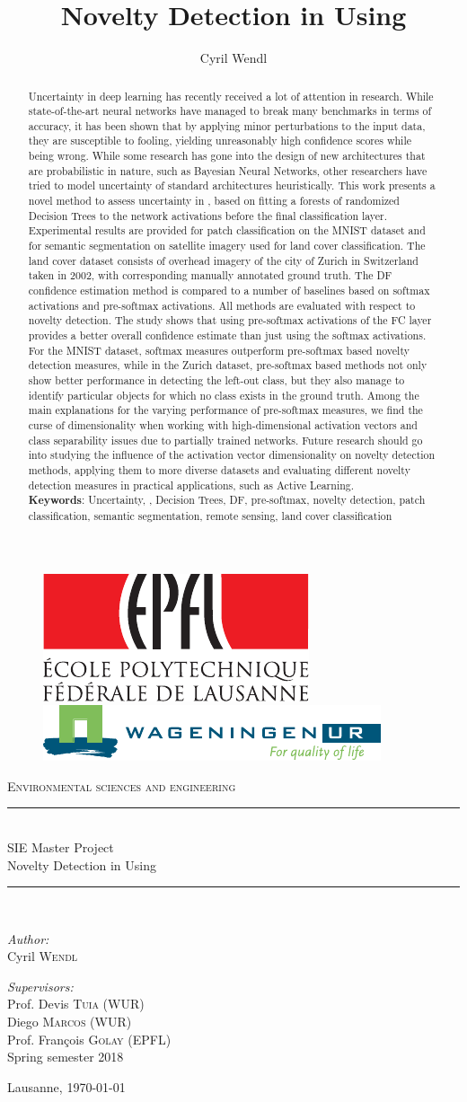 \documentclass[10pt]{article}
\author{Cyril Wendl}
\title{Novelty Detection in \acrlongpl{CNN} Using \acrlongpl{DF}
}
\newcommand{\maketitlepage}{
    \begin{titlepage}
    	\begin{center}
    		\begin{figure}[H]
    			\centering
    			\includegraphics[height=.09\textwidth]{logo} 
    			\hspace{1cm}
    			\includegraphics[height=.07\textwidth]{logo_wur_quality_of_life}
    		\end{figure}
    		\textsc{Environmental sciences and engineering}\\[0.5cm]
    		
    		\newcommand{\HRule}{\rule{\linewidth}{0.2mm}}
    		\HRule \\[0.5cm]
    		{\large SIE Master Project}\\[0.2cm]
    		{\huge Novelty Detection in \acrlongpl{CNN} Using \acrlongpl{DF}
    		}\\[0.5cm]
    		\HRule \\[0.5cm]
    		
    		\begin{minipage}[t]{0.45\textwidth}
    			\begin{flushleft} \large
    				\emph{Author:}\\[0.2cm]
    				Cyril \textsc{Wendl}
    			\end{flushleft}
    		\end{minipage}
    		\hfill
    		\begin{minipage}[t]{0.45\textwidth}
    			\begin{flushright} \large
    				\emph{Supervisors:}\\[0.2cm]
    				Prof. Devis \textsc{Tuia} (WUR)\\
    				Diego \textsc{Marcos} (WUR)\\
    				Prof. François \textsc{Golay} (EPFL)\\
    				Spring semester 2018
    			\end{flushright}
    		\end{minipage}
    		\vfill
    		
    		{\large Lausanne, \today}
    	\end{center}
    \end{titlepage}
}
\begin{document}
\maketitlepage

\vfill
\maketitle
\begin{abstract}
	Uncertainty in deep learning has recently received a lot of attention in research. While state-of-the-art neural networks have managed to break many benchmarks in terms of accuracy, it has been shown that by applying minor perturbations to the input data, they are susceptible to fooling, yielding unreasonably high confidence scores while being wrong. While some research has gone into the design of new architectures that are probabilistic in nature, such as Bayesian Neural Networks, other researchers have tried to model uncertainty of standard architectures heuristically. This work presents a novel method to assess uncertainty in , based on fitting a forests of randomized Decision Trees to the network activations before the final classification layer. Experimental results are provided for patch classification on the \acrshort{MNIST} dataset and for semantic segmentation on satellite imagery used for land cover classification. The land cover dataset consists of overhead imagery of the city of Zurich in Switzerland taken in 2002, with corresponding manually annotated ground truth. The \acrlong{DF} confidence estimation method is compared to a number of baselines based on softmax activations and pre-softmax activations. All methods are evaluated with respect to novelty detection. The study shows that using pre-softmax activations of the \acrlong{FC} layer provides a better overall confidence estimate than just using the softmax activations. For the \acrshort{MNIST} dataset, softmax measures outperform pre-softmax based novelty detection measures, while in the Zurich dataset, pre-softmax based methods not only show better performance in detecting the left-out class, but they also manage to identify particular objects for which no class exists in the ground truth. Among the main explanations for the varying performance of pre-softmax measures, we find the curse of dimensionality when working with high-dimensional activation vectors and class separability issues due to partially trained networks. Future research should go into studying the influence of the activation vector dimensionality on novelty detection methods, applying them to more diverse datasets and evaluating different novelty detection measures in practical applications, such as Active Learning.\\
	
	\textbf{Keywords}: Uncertainty, , Decision Trees, \acrlong{DF}, pre-softmax, novelty detection, patch classification, semantic segmentation, remote sensing, land cover classification
\end{abstract}
\vfill
\newpage
\end{document}
